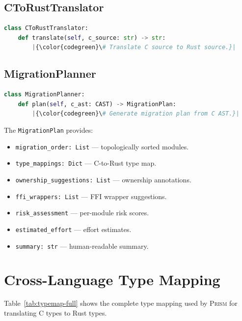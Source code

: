 \documentclass[11pt,a4paper]{article}
\begin{document}
\begin{appendices}
\subsection{CToRustTranslator}

\begin{lstlisting}[language=Python,escapechar=|]
class CToRustTranslator:
    def translate(self, c_source: str) -> str:
        |{\color{codegreen}\# Translate C source to Rust source.}|
\end{lstlisting}

\subsection{MigrationPlanner}

\begin{lstlisting}[language=Python,escapechar=|]
class MigrationPlanner:
    def plan(self, c_ast: CAST) -> MigrationPlan:
        |{\color{codegreen}\# Generate migration plan from C AST.}|
\end{lstlisting}

The \texttt{MigrationPlan} provides:
\begin{itemize}
  \item \texttt{migration\_order: List} --- topologically sorted modules.
  \item \texttt{type\_mappings: Dict} --- C-to-Rust type map.
  \item \texttt{ownership\_suggestions: List} --- ownership annotations.
  \item \texttt{ffi\_wrappers: List} --- FFI wrapper suggestions.
  \item \texttt{risk\_assessment} --- per-module risk scores.
  \item \texttt{estimated\_effort} --- effort estimates.
  \item \texttt{summary: str} --- human-readable summary.
\end{itemize}


\section{Cross-Language Type Mapping}\label{app:typemap}

Table~\ref{tab:typemap-full} shows the complete type mapping used by
\textsc{Prism} for translating C types to Rust types.


\end{appendices}
\end{document}
